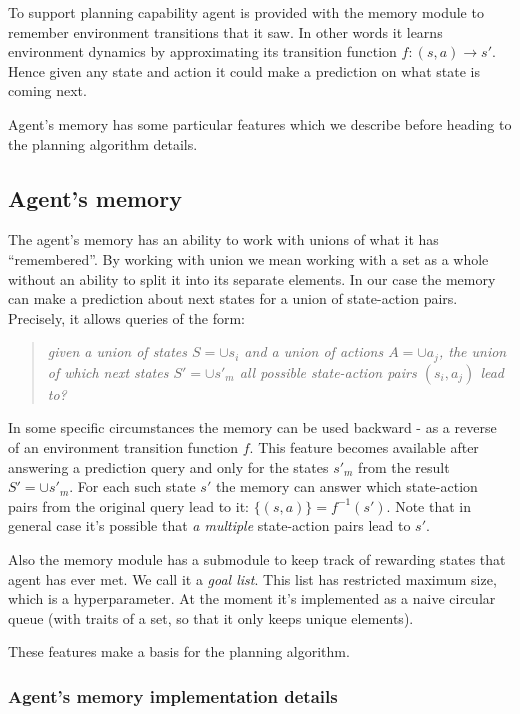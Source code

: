 \documentclass[runningheads]{llncs}
\begin{document}
To support planning capability agent is provided with the memory module to remember environment transitions that it saw. In other words it learns environment dynamics by approximating its transition function $f: (s, a) \rightarrow s'$. Hence given any state and action it could make a prediction on what state is coming next.

Agent's memory has some particular features which we describe before heading to the planning algorithm details.

\subsection{Agent's memory}

The agent's memory has an ability to work with unions of what it has ``remembered''. By working with union we mean working with a set as a whole without an ability to split it into its separate elements. In our case the memory can make a prediction about next states for a union of state-action pairs. Precisely, it allows queries of the form:

\begin{quote}
  \textit{given a union of states $S=\cup s_i$ and a union of actions $A=\cup a_j$, the union of which next states $S'= \cup s'_m$ all possible state-action pairs $(s_i, a_j)$ lead to?}
\end{quote}

In some specific circumstances the memory can be used backward - as a reverse of an environment transition function $f$. This feature becomes available after answering a prediction query and only for the states $s'_m$ from the result $S' = \cup s'_m$. For each such state $s'$ the memory can answer which state-action pairs from the original query lead to it: $\{(s, a)\} = f^{-1}(s')$. Note that in general case it's possible that \textit{a multiple} state-action pairs lead to $s'$.

Also the memory module has a submodule to keep track of rewarding states that agent has ever met. We call it a \textit{goal list}. This list has restricted maximum size, which is a hyperparameter. At the moment it's implemented as a naive circular queue (with traits of a set, so that it only keeps unique elements).

These features make a basis for the planning algorithm.

\subsubsection{Agent's memory implementation details}
\end{document}
